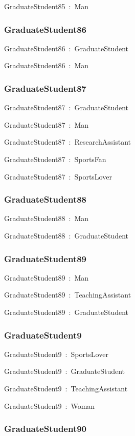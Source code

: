 \documentclass{article}
\begin{document}
GraduateStudent85~:~Man

\subsubsection*{GraduateStudent86}

GraduateStudent86~:~GraduateStudent

GraduateStudent86~:~Man

\subsubsection*{GraduateStudent87}

GraduateStudent87~:~GraduateStudent

GraduateStudent87~:~Man

GraduateStudent87~:~ResearchAssistant

GraduateStudent87~:~SportsFan

GraduateStudent87~:~SportsLover

\subsubsection*{GraduateStudent88}

GraduateStudent88~:~Man

GraduateStudent88~:~GraduateStudent

\subsubsection*{GraduateStudent89}

GraduateStudent89~:~Man

GraduateStudent89~:~TeachingAssistant

GraduateStudent89~:~GraduateStudent

\subsubsection*{GraduateStudent9}

GraduateStudent9~:~SportsLover

GraduateStudent9~:~GraduateStudent

GraduateStudent9~:~TeachingAssistant

GraduateStudent9~:~Woman

\subsubsection*{GraduateStudent90}
\end{document}
